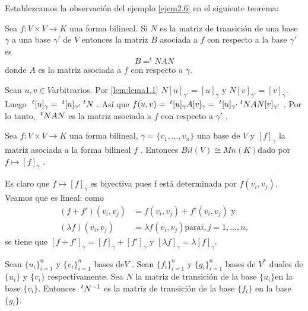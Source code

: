 		Establezcamos la observación del ejemplo \ref{ejem2.6} en el siguiente teorema:
		\begin{teo} \normalfont
			Sea $ f : V \times V \longrightarrow K $ una forma bilineal. Si $ N $ es la matriz de transición de una base $\gamma$ a una base $\gamma'$ de $ V $ entonces la matriz $  B  $ asociada a $ f $ con respecto a la base $\gamma'$ es
			\[ B = ^{t}N AN \]
			donde $ A $ es la matriz asociada a $ f $ con respecto a $\gamma$.
		\end{teo}
		\begin{demo}
			\normalfont 
			 Sean $ u, v \in V  $arbitrarios. Por \ref{lem:lema1.1} $N [u]_{\gamma'}  =  [u]_{\gamma}$ y $N [v]_{\gamma'} = [v]_{\gamma} $.     Luego $ \textcolor{white}{.}^{t}[u]_{\gamma} =\\ \textcolor{white}{.}^{t}[u]_{\gamma'} \textcolor{white}{.}^{t}N $ . Así que $ f (u, v) = \textcolor{white}{.}^{t}[u]_{\gamma} A[v]_{\gamma} = \textcolor{white}{.}^{t}[u]_{\gamma'} \textcolor{white}{.}^{t}N AN [v]_{\gamma'} $ . Por lo tanto, $ \textcolor{white}{.}^{t}N AN $ es la matriz asociada a $ f $ con respecto a $\gamma'$ .
		\end{demo}
		\begin{teo}
			\normalfont
			Sea $ f : V \times V \longrightarrow K $ una forma bilineal, $ \gamma = \{v_{1} , \ldots, v_{n} \} $ una base de $ V $ y $ [f ]_{\gamma} $ la matriz asociada a la forma bilineal $ f $ . Entonces $ Bil(V ) \cong Mn (K)  $dado por $ f \longmapsto [f ]_{\gamma} $ .
		\end{teo}
		\begin{demo}
			\normalfont Es claro que $ f \longmapsto [f ]_{\gamma} $ es biyectiva pues f est\'a determinada por $ f (v_{i} , v_{j} ) $. Veamos que es lineal: como
			\begin{align*}
				(f + f')(v_{i }, v_{j} ) &= f (v_{i} , v_{j} ) + f' (v_{i} , v_{j} )   \text{        y} \\ (\lambda f)(v_{i} , v_{j} ) &= \lambda f(v_{i} , v_{j} ) \text{para} i,j=1,\ldots,n,
			\end{align*}
			se tiene que  $ [f + f ' ]_{\gamma} = [f ]_{\gamma} + [f ' ]_{\gamma}$ y $[\lambda f ]_{\gamma} = \lambda[f ]_{\gamma}$.
		\end{demo}
		\begin{pro}
			\normalfont   Sean $ \{u_{i} \}^{n}_{i=1} $ y $ \{v_{i}\}^{n}_{i=1} $ bases de$  V $ . Sean $ \{f_{i} \}^{n}_{i=1 } $ y $ \{g_{i} \}^{n}_{i=1} $ bases de $ V^{*} $ duales de $ \{u_{i}\}  $ y $ \{v_{i}\} $ respectivamente. Sea $ N  $ la matriz de transición de la base $ \{u_{i}\}  $en la base $ \{v_{i}\} $. Entonces $ \textcolor{white}{.}^{t}N^{-1} $ es la matriz de transición de la base $ \{f_{i} \} $ en la base $ \{g_{i} \} $.
		\end{pro}
